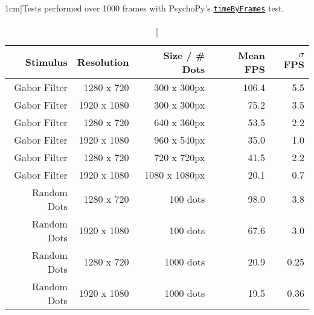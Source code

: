\begin{table}
\caption[][1cm]{Tests performed over 1000 frames with PsychoPy's \href{https://github.com/psychopy/psychopy/blob/3.1/psychopy/demos/coder/timing/timeByFrames.py}{\texttt{timeByFrames}} test.}
    \begin{tabular}{rrr|rr}
        \toprule
        \textbf{Stimulus} & \textbf{Resolution} & \textbf{Size / \# Dots}& \textbf{Mean FPS} & \textbf{$\sigma$ FPS} \\
        \midrule 
        Gabor Filter & 1280 x 720  & 300 x 300px & 106.4 & 5.5 \\
        Gabor Filter & 1920 x 1080 & 300 x 300px & 75.2 & 3.5\\
        Gabor Filter & 1280 x 720 & 640 x 360px & 53.5 & 2.2\\ 
        Gabor Filter & 1920 x 1080 & 960 x 540px & 35.0 & 1.0 \\
        Gabor Filter & 1280 x 720 & 720 x 720px & 41.5 & 2.2 \\
        Gabor Filter & 1920 x 1080 & 1080 x 1080px & 20.1 & 0.7 \\
        Random Dots & 1280 x 720 & 100 dots & 98.0 & 3.8 \\
        Random Dots & 1920 x 1080 & 100 dots & 67.6 & 3.0 \\
        Random Dots & 1280 x 720 & 1000 dots & 20.9 & 0.25 \\
        Random Dots & 1920 x 1080 & 1000 dots & 19.5 & 0.36 \\
        \bottomrule
    \end{tabular}
    \label{tab:fpstests}
\end{table}

